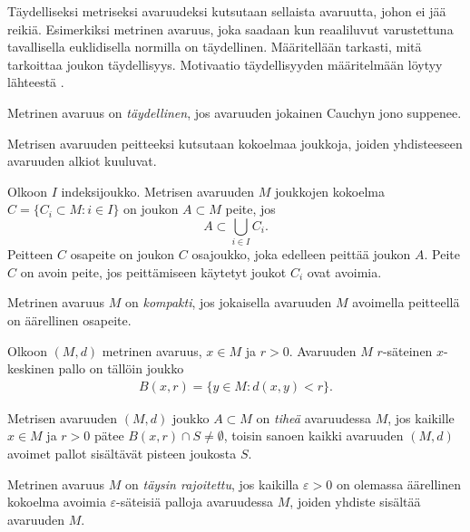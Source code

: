 \documentclass[12pt,oneside,a4paper]{amsbook} %
\begin{document}
Täydelliseksi metriseksi avaruudeksi kutsutaan sellaista avaruutta, johon ei jää reikiä. Esimerkiksi metrinen avaruus, joka saadaan kun reaaliluvut varustettuna tavallisella euklidisella normilla on täydellinen. Määritellään tarkasti, mitä tarkoittaa joukon täydellisyys. Motivaatio täydellisyyden määritelmään löytyy lähteestä \cite[s. 54]{rudin}.

\begin{definition}
    Metrinen avaruus on \textit{täydellinen}, jos avaruuden jokainen Cauchyn jono suppenee. 
\end{definition} 

Metrisen avaruuden peitteeksi kutsutaan kokoelmaa joukkoja, joiden yhdisteeseen avaruuden alkiot kuuluvat.

\begin{definition}
    Olkoon $I$ indeksijoukko. Metrisen avaruuden $M$ joukkojen kokoelma $C = \{C_i \subset M \colon i \in I\}$ on joukon $A \subset M$ peite, jos 
    \begin{equation*}
        A \subset \bigcup_{i\in I}C_i.
    \end{equation*}
    Peitteen $C$ osapeite on joukon $C$ osajoukko, joka edelleen peittää joukon $A$. Peite $C$ on avoin peite, jos peittämiseen käytetyt joukot $C_i$ ovat avoimia. 
\end{definition}

\begin{definition}
    Metrinen avaruus $M$ on \textit{kompakti}, jos jokaisella avaruuden $M$ avoimella peitteellä on äärellinen osapeite. 
\end{definition}

\begin{definition}
    Olkoon $(M, d)$ metrinen avaruus, $x \in M$ ja $r > 0$. Avaruuden $M$ $r$-säteinen $x$-keskinen pallo on tällöin joukko
    \begin{align*}
        B(x, r) = \{y \in M : d(x, y) < r\}.
    \end{align*}
\end{definition}

\begin{definition}
    Metrisen avaruuden $(M, d)$ joukko $A \subset M$ on \textit{tiheä} avaruudessa $M$, jos kaikille $x \in M$ ja $r > 0$ pätee $B(x, r) \cap S \ne \emptyset$, toisin sanoen kaikki avaruuden $(M, d)$ avoimet pallot sisältävät pisteen joukosta $S$.
\end{definition}

\begin{definition}
    Metrinen avaruus $M$ on \textit{täysin rajoitettu}, jos kaikilla $\varepsilon > 0$ on olemassa äärellinen kokoelma avoimia $\varepsilon$-säteisiä palloja avaruudessa $M$, joiden yhdiste sisältää avaruuden $M$.
\end{definition}
\end{document}
